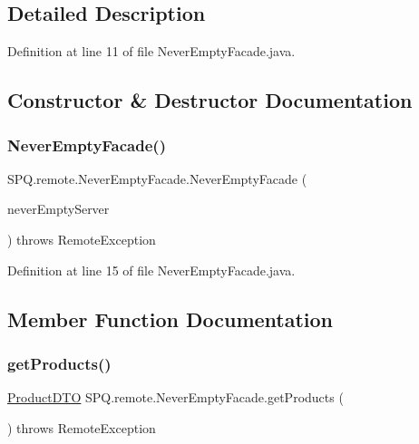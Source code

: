 \subsection{Detailed Description}


Definition at line 11 of file Never\+Empty\+Facade.\+java.



\subsection{Constructor \& Destructor Documentation}
\mbox{\label{class_s_p_q_1_1remote_1_1_never_empty_facade_afc6e9b52fbed599fb3f152533d2bedea}} 
\subsubsection{\texorpdfstring{Never\+Empty\+Facade()}{NeverEmptyFacade()}}
{\footnotesize\ttfamily S\+P\+Q.\+remote.\+Never\+Empty\+Facade.\+Never\+Empty\+Facade (\begin{DoxyParamCaption}\item[{\mbox{\hyperlink{class_s_p_q_1_1_never_empty_server}{Never\+Empty\+Server}}}]{never\+Empty\+Server }\end{DoxyParamCaption}) throws Remote\+Exception}



Definition at line 15 of file Never\+Empty\+Facade.\+java.



\subsection{Member Function Documentation}
\mbox{\label{class_s_p_q_1_1remote_1_1_never_empty_facade_a4c8bdeeb3d2c3eb2c28aec1043e9274f}} 
\subsubsection{\texorpdfstring{get\+Products()}{getProducts()}}
{\footnotesize\ttfamily \mbox{\hyperlink{class_s_p_q_1_1dto_1_1_product_d_t_o}{Product\+D\+TO}} S\+P\+Q.\+remote.\+Never\+Empty\+Facade.\+get\+Products (\begin{DoxyParamCaption}{ }\end{DoxyParamCaption}) throws Remote\+Exception}



